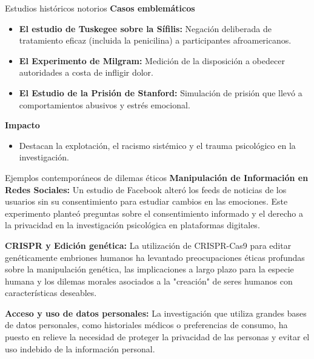 ﻿\documentclass{beamer}
\begin{document}
\begin{frame}{Estudios históricos notorios}
    \textbf{Casos emblemáticos}
    \begin{itemize}
        \item \textbf{El estudio de Tuskegee sobre la Sífilis:} Negación deliberada de tratamiento eficaz (incluida la penicilina) a participantes afroamericanos.
        \item \textbf{El Experimento de Milgram:} Medición de la disposición a obedecer autoridades a costa de infligir dolor.
        \item \textbf{El Estudio de la Prisión de Stanford:} Simulación de prisión que llevó a comportamientos abusivos y estrés emocional.
    \end{itemize}

    \textbf{Impacto}
    \begin{itemize}
        \item Destacan la explotación, el racismo sistémico y el trauma psicológico en la investigación.
    \end{itemize}
\end{frame}

\begin{frame}{Ejemplos contemporáneos de dilemas éticos}
\textbf{Manipulación de Información en Redes Sociales:} Un estudio de Facebook alteró los feeds de noticias de los usuarios sin su consentimiento para estudiar cambios en las emociones. Este experimento planteó preguntas sobre el consentimiento informado y el derecho a la privacidad en la investigación psicológica en plataformas digitales.

\textbf{CRISPR y Edición genética:} La utilización de CRISPR-Cas9 para editar genéticamente embriones humanos ha levantado preocupaciones éticas profundas sobre la manipulación genética, las implicaciones a largo plazo para la especie humana y los dilemas morales asociados a la "creación" de seres humanos con características deseables.

\textbf{Acceso y uso de datos personales:} La investigación que utiliza grandes bases de datos personales, como historiales médicos o preferencias de consumo, ha puesto en relieve la necesidad de proteger la privacidad de las personas y evitar el uso indebido de la información personal.

\end{frame}
\end{document}
